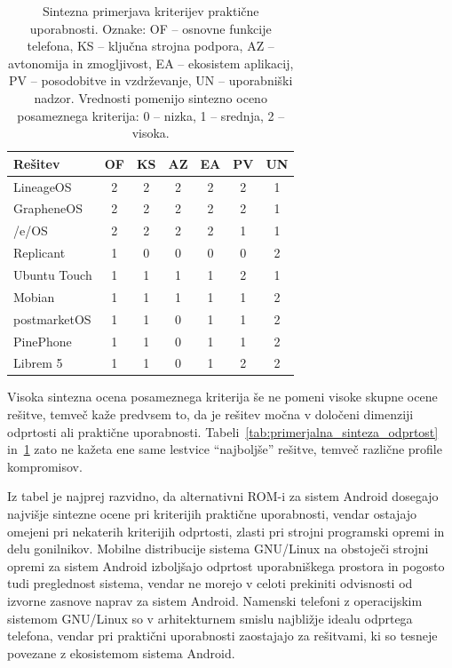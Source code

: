 \documentclass[a4paper,12pt,openright]{book}
\begin{document}
\begin{table}[htb]
\centering
\small
\setlength{\tabcolsep}{4pt}
\renewcommand{\arraystretch}{1.1}
\begin{tabular}{lcccccc}
\hline
\textbf{Rešitev} & \textbf{OF} & \textbf{KS} & \textbf{AZ} & \textbf{EA} & \textbf{PV} & \textbf{UN} \\
\hline
LineageOS    & 2 & 2 & 2 & 2 & 2 & 1 \\
GrapheneOS   & 2 & 2 & 2 & 2 & 2 & 1 \\
/e/OS        & 2 & 2 & 2 & 2 & 1 & 1 \\
Replicant    & 1 & 0 & 0 & 0 & 0 & 2 \\
Ubuntu Touch & 1 & 1 & 1 & 1 & 2 & 1 \\
Mobian       & 1 & 1 & 1 & 1 & 1 & 2 \\
postmarketOS & 1 & 1 & 0 & 1 & 1 & 2 \\
PinePhone    & 1 & 1 & 0 & 1 & 1 & 2 \\
Librem 5     & 1 & 1 & 0 & 1 & 2 & 2 \\
\hline
\end{tabular}
\caption{Sintezna primerjava kriterijev praktične uporabnosti. Oznake: OF -- osnovne funkcije telefona, KS -- ključna strojna podpora, AZ -- avtonomija in zmogljivost, EA -- ekosistem aplikacij, PV -- posodobitve in vzdrževanje, UN -- uporabniški nadzor. Vrednosti pomenijo sintezno oceno posameznega kriterija: 0 -- nizka, 1 -- srednja, 2 -- visoka.}
\label{tab:primerjalna_sinteza_uporabnost}
\end{table}
\FloatBarrier

Visoka sintezna ocena posameznega kriterija še ne pomeni visoke skupne ocene rešitve, temveč kaže predvsem to, da je rešitev močna v določeni dimenziji odprtosti ali praktične uporabnosti.
Tabeli~\ref{tab:primerjalna_sinteza_odprtost} in~\ref{tab:primerjalna_sinteza_uporabnost} zato ne kažeta ene same lestvice \enquote{najboljše} rešitve, temveč različne profile kompromisov.

Iz tabel je najprej razvidno, da alternativni ROM-i za sistem Android dosegajo najvišje sintezne ocene pri kriterijih praktične uporabnosti, vendar ostajajo omejeni pri nekaterih kriterijih odprtosti, zlasti pri strojni programski opremi in delu gonilnikov.
Mobilne distribucije sistema GNU/Linux na obstoječi strojni opremi za sistem Android izboljšajo odprtost uporabniškega prostora in pogosto tudi preglednost sistema, vendar ne morejo v celoti prekiniti odvisnosti od izvorne zasnove naprav za sistem Android.
Namenski telefoni z operacijskim sistemom GNU/Linux so v arhitekturnem smislu najbližje idealu odprtega telefona, vendar pri praktični uporabnosti zaostajajo za rešitvami, ki so tesneje povezane z ekosistemom sistema Android.
\end{document}
